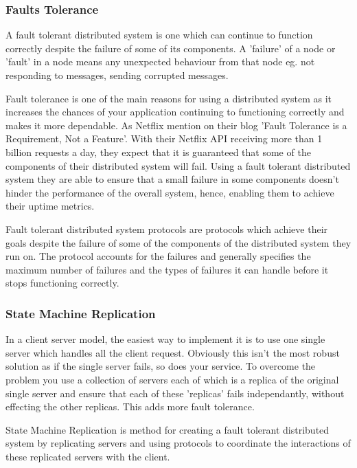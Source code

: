 \subsubsection{Faults Tolerance}
A fault tolerant distributed system is one which can continue to function correctly
despite the failure of some of its components. A 'failure' of a node or 'fault' in a node
means any unexpected behaviour from that node eg. not responding to messages, sending
corrupted messages.

Fault tolerance is one of the main reasons for using a distributed system as it
increases the chances of your application continuing to functioning correctly and
makes it more dependable. As Netflix mention on their blog
'Fault Tolerance is a Requirement, Not a Feature'.
With their Netflix API receiving more than 1 billion requests a day, they expect
that it is guaranteed that some of the components of their distributed system will fail.
Using a fault tolerant distributed system they are able to ensure that a small failure
in some components doesn't hinder the performance of the overall system, hence,
enabling them to achieve their uptime metrics.

Fault tolerant distributed system protocols are protocols which achieve their
goals despite the failure of some of the components of the distributed system they run on.
The protocol accounts for the failures and generally specifies the maximum number of
failures and the types of failures it can handle before it stops functioning correctly.

\subsubsection{State Machine Replication}

In a client server model, the easiest way to implement it is to use one single server
which handles all the client request. Obviously this isn't the most robust solution
as if the single server fails, so does your service. To overcome the problem you
use a collection of servers each of which is a replica of the original single server and
ensure that each of these 'replicas' fails independantly, without effecting the other replicas.
This adds more fault tolerance.

State Machine Replication is method for creating a fault tolerant distributed system
by replicating servers and using protocols to coordinate the interactions of these
replicated servers with the client.

